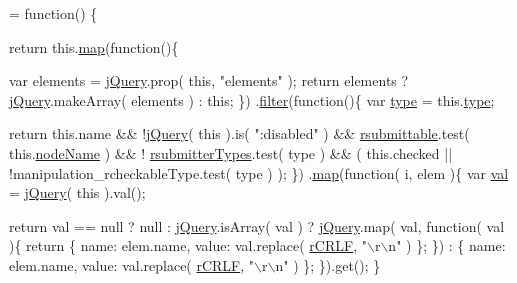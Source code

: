 \begin{DoxyCode}
= \textcolor{keyword}{function}() \{


        \textcolor{keywordflow}{return} this.\hyperlink{jquery-1_810_82-vsdoc_8js_a20838f8c4bedc779e51bf830f5a4d471}{map}(\textcolor{keyword}{function}()\{
            
            var elements = \hyperlink{jquery-1_810_82-vsdoc_8js_add5237586d970a38a81f990e8eb28c6c}{jQuery}.prop( \textcolor{keyword}{this}, \textcolor{stringliteral}{"elements"} );
            \textcolor{keywordflow}{return} elements ? \hyperlink{jquery-1_810_82-vsdoc_8js_add5237586d970a38a81f990e8eb28c6c}{jQuery}.makeArray( elements ) : \textcolor{keyword}{this};
        \})
        .\hyperlink{jquery-1_810_82-vsdoc_8js_ac99d0cf56cab46114f5765a14e03ad6d}{filter}(\textcolor{keyword}{function}()\{
            var \hyperlink{jquery-1_810_82-vsdoc_8js_a3940565e83a9bfd10d95ffd27536da91}{type} = this.\hyperlink{jquery-1_810_82-vsdoc_8js_a3940565e83a9bfd10d95ffd27536da91}{type};
            
            \textcolor{keywordflow}{return} this.name && !\hyperlink{jquery-1_810_82-vsdoc_8js_add5237586d970a38a81f990e8eb28c6c}{jQuery}( \textcolor{keyword}{this} ).is( \textcolor{stringliteral}{":disabled"} ) &&
                \hyperlink{jquery-1_810_82_8js_a12d248d7e6c5985c5ea21f56fbef9e90}{rsubmittable}.test( this.\hyperlink{jquery-1_810_82-vsdoc_8js_a269e960a03eef49b8ed3a84932c1334d}{nodeName} ) && !
      \hyperlink{jquery-1_810_82_8js_a0e9cd4ca08945afe827846f34a36c74a}{rsubmitterTypes}.test( type ) &&
                ( this.checked || !manipulation\_rcheckableType.test( type ) );
        \})
        .\hyperlink{jquery-1_810_82-vsdoc_8js_a20838f8c4bedc779e51bf830f5a4d471}{map}(\textcolor{keyword}{function}( i, elem )\{
            var \hyperlink{jquery-1_810_82-vsdoc_8js_a0888cacd53defa08fbb4972d54ece4b0}{val} = \hyperlink{jquery-1_810_82-vsdoc_8js_add5237586d970a38a81f990e8eb28c6c}{jQuery}( \textcolor{keyword}{this} ).val();

            \textcolor{keywordflow}{return} val == null ?
                null :
                \hyperlink{jquery-1_810_82-vsdoc_8js_add5237586d970a38a81f990e8eb28c6c}{jQuery}.isArray( val ) ?
                    \hyperlink{jquery-1_810_82-vsdoc_8js_add5237586d970a38a81f990e8eb28c6c}{jQuery}.map( val, \textcolor{keyword}{function}( val )\{
                        \textcolor{keywordflow}{return} \{ name: elem.name, value: val.replace( \hyperlink{jquery-1_810_82_8js_a4fd9dfc4eb645b441a3e84730c50154b}{rCRLF}, \textcolor{stringliteral}{"\(\backslash\)r\(\backslash\)n"} ) \};
                    \}) :
                    \{ name: elem.name, value: val.replace( \hyperlink{jquery-1_810_82_8js_a4fd9dfc4eb645b441a3e84730c50154b}{rCRLF}, \textcolor{stringliteral}{"\(\backslash\)r\(\backslash\)n"} ) \};
        \}).\textcolor{keyword}{get}();
    \}
\end{DoxyCode}
